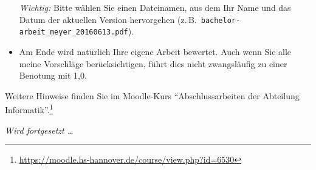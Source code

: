 \begin{itemize}
    \emph{Wichtig:} Bitte wählen Sie einen Dateinamen, aus dem Ihr Name und das Datum der
    aktuellen Version hervorgehen (z.\,B.\ \verb+bachelor-arbeit_meyer_20160613.pdf+).
  \item Am Ende wird natürlich Ihre eigene Arbeit bewertet.
    Auch wenn Sie alle meine Vorschläge berücksichtigen, führt dies nicht zwangsläufig zu
    einer Benotung mit 1,0.
\end{itemize}

Weitere Hinweise finden Sie im Moodle-Kurs "`Abschlussarbeiten der Abteilung
Informatik"'.\footnote{\url{https://moodle.hs-hannover.de/course/view.php?id=6530}}

\vspace{\baselineskip}
\emph{Wird fortgesetzt \ldots}

